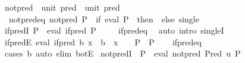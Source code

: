 \begin{isabellebody}
\isanewline
{}\isamarkupfalse%
\ not{\isacharunderscore}{\kern0pt}pred\ {\isacharcolon}{\kern0pt}{\isacharcolon}{\kern0pt}\ {\isachardoublequoteopen}unit\ pred\ {\isasymRightarrow}\ unit\ pred{\isachardoublequoteclose}\ \isanewline
\ \ not{\isacharunderscore}{\kern0pt}pred{\isacharunderscore}{\kern0pt}eq{\isacharcolon}{\kern0pt}\ {\isachardoublequoteopen}not{\isacharunderscore}{\kern0pt}pred\ P\ {\isacharequal}{\kern0pt}\ {\isacharparenleft}{\kern0pt}if\ eval\ P\ {\isacharparenleft}{\kern0pt}{\isacharparenright}{\kern0pt}\ then\ {\isasymbottom}\ else\ single\ {\isacharparenleft}{\kern0pt}{\isacharparenright}{\kern0pt}{\isacharparenright}{\kern0pt}{\isachardoublequoteclose}\isanewline
\isanewline
{}\isamarkupfalse%
\ if{\isacharunderscore}{\kern0pt}predI{\isacharcolon}{\kern0pt}\ {\isachardoublequoteopen}P\ {\isasymLongrightarrow}\ eval\ {\isacharparenleft}{\kern0pt}if{\isacharunderscore}{\kern0pt}pred\ P{\isacharparenright}{\kern0pt}\ {\isacharparenleft}{\kern0pt}{\isacharparenright}{\kern0pt}{\isachardoublequoteclose}\isanewline
%
\isadelimproof
\ \ %
\endisadelimproof
%
\isatagproof
{}\isamarkupfalse%
\ if{\isacharunderscore}{\kern0pt}pred{\isacharunderscore}{\kern0pt}eq\ \isamarkupfalse%
\ {\isacharparenleft}{\kern0pt}auto\ intro{\isacharcolon}{\kern0pt}\ singleI{\isacharparenright}{\kern0pt}%
\endisatagproof
{\isafoldproof}%
%
\isadelimproof
\isanewline
%
\endisadelimproof
\isanewline
{}\isamarkupfalse%
\ if{\isacharunderscore}{\kern0pt}predE{\isacharcolon}{\kern0pt}\ {\isachardoublequoteopen}eval\ {\isacharparenleft}{\kern0pt}if{\isacharunderscore}{\kern0pt}pred\ b{\isacharparenright}{\kern0pt}\ x\ {\isasymLongrightarrow}\ {\isacharparenleft}{\kern0pt}b\ {\isasymLongrightarrow}\ x\ {\isacharequal}{\kern0pt}\ {\isacharparenleft}{\kern0pt}{\isacharparenright}{\kern0pt}\ {\isasymLongrightarrow}\ P{\isacharparenright}{\kern0pt}\ {\isasymLongrightarrow}\ P{\isachardoublequoteclose}\isanewline
%
\isadelimproof
\ \ %
\endisadelimproof
%
\isatagproof
{}\isamarkupfalse%
\ if{\isacharunderscore}{\kern0pt}pred{\isacharunderscore}{\kern0pt}eq\ \isamarkupfalse%
\ {\isacharparenleft}{\kern0pt}cases\ b{\isacharparenright}{\kern0pt}\ {\isacharparenleft}{\kern0pt}auto\ elim{\isacharcolon}{\kern0pt}\ botE{\isacharparenright}{\kern0pt}%
\endisatagproof
{\isafoldproof}%
%
\isadelimproof
\isanewline
%
\endisadelimproof
\isanewline
{}\isamarkupfalse%
\ not{\isacharunderscore}{\kern0pt}predI{\isacharcolon}{\kern0pt}\ {\isachardoublequoteopen}{\isasymnot}\ P\ {\isasymLongrightarrow}\ eval\ {\isacharparenleft}{\kern0pt}not{\isacharunderscore}{\kern0pt}pred\ {\isacharparenleft}{\kern0pt}Pred\ {\isacharparenleft}{\kern0pt}{\isasymlambda}u{\isachardot}{\kern0pt}\ P{\isacharparenright}{\kern0pt}{\isacharparenright}{\kern0pt}{\isacharparenright}{\kern0pt}\ {\isacharparenleft}{\kern0pt}{\isacharparenright}{\kern0pt}{\isachardoublequoteclose}\isanewline

\end{isabellebody}
